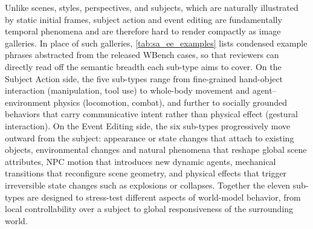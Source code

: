 \documentclass{llmxive}
\providecommand{\benchmark}{WBench }
\begin{document}
Unlike scenes, styles, perspectives, and subjects, which are naturally illustrated by static initial frames, subject action and event editing are fundamentally temporal phenomena and are therefore hard to render compactly as image galleries. In place of such galleries, \cref{tab:sa_ee_examples} lists condensed example phrases abstracted from the released \benchmark cases, so that reviewers can directly read off the semantic breadth each sub-type aims to cover. On the Subject Action side, the five sub-types range from fine-grained hand-object interaction (manipulation, tool use) to whole-body movement and agent--environment physics (locomotion, combat), and further to socially grounded behaviors that carry communicative intent rather than physical effect (gestural interaction). On the Event Editing side, the six sub-types progressively move outward from the subject: appearance or state changes that attach to existing objects, environmental changes and natural phenomena that reshape global scene attributes, NPC motion that introduces new dynamic agents, mechanical transitions that reconfigure scene geometry, and physical effects that trigger irreversible state changes such as explosions or collapses. Together the eleven sub-types are designed to stress-test different aspects of world-model behavior, from local controllability over a subject to global responsiveness of the surrounding world.
\end{document}
